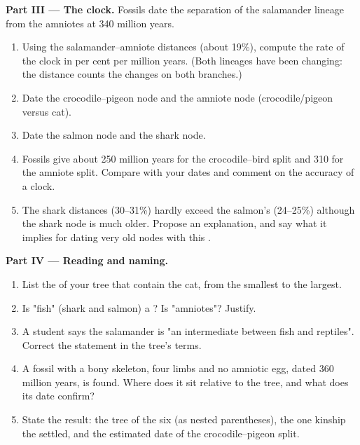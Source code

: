 \begin{problem}
\medskip
\noindent\textbf{Part III --- The clock.}
Fossils date the separation of the salamander lineage from the
amniotes at 340 million years.
\begin{enumerate}[resume]
  \item Using the salamander--amniote distances (about 19\%), compute
        the rate of the clock in per cent per million years. (Both
        lineages have been changing: the distance counts the changes
        on both branches.)
  \item Date the crocodile--pigeon node and the amniote node
        (crocodile/pigeon versus cat).
  \item Date the salmon node and the shark node.
  \item Fossils give about 250 million years for the crocodile--bird
        split and 310 for the amniote split. Compare with your dates
        and comment on the accuracy of a  clock.
  \item The shark distances (30--31\%) hardly exceed the salmon's
        (24--25\%) although the shark node is much older. Propose an
        explanation, and say what it implies for dating very old
        nodes with this .
\end{enumerate}

\medskip
\noindent\textbf{Part IV --- Reading and naming.}
\begin{enumerate}[resume]
  \item List the  of your tree that contain the cat, from the
        smallest to the largest.
  \item Is "fish" (shark and salmon) a ? Is "amniotes"? Justify.
  \item A student says the salamander is "an intermediate between fish
        and reptiles". Correct the statement in the tree's terms.
  \item A fossil with a bony skeleton, four limbs and no amniotic egg,
        dated 360 million years, is found. Where does it sit relative
        to the tree, and what does its date confirm?
  \item State the result: the tree of the six  (as nested
        parentheses), the one kinship the  settled, and the
        estimated date of the crocodile--pigeon split.
\end{enumerate}
\end{problem}
